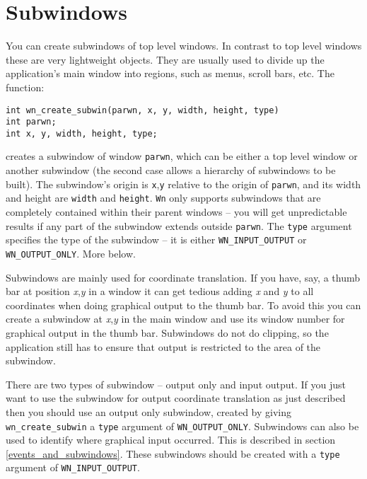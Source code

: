 \section{Subwindows}
You can create subwindows of top level windows.
In contrast to top level windows these are very lightweight objects.
They are usually used to divide up the application's main window into
regions, such as menus, scroll bars, etc.
\label{subwindows}
The function:
\begin{verbatim}
int wn_create_subwin(parwn, x, y, width, height, type)
int parwn;
int x, y, width, height, type;
\end{verbatim}
creates a subwindow of window {\tt parwn}, which can be either a
top level window or another subwindow (the second case allows
a hierarchy of subwindows to be built).
The subwindow's origin is {\tt x},{\tt y} relative to the origin
of {\tt parwn}, and its width and height are {\tt width} and {\tt height}.
{\tt Wn} only supports subwindows that are completely contained within
their parent windows -- you will get unpredictable results if any part
of the subwindow extends outside {\tt parwn}.
The {\tt type} argument specifies the type of the subwindow -- it is
either {\tt WN\_INPUT\_OUTPUT} or {\tt WN\_OUTPUT\_ONLY}.  More below.

Subwindows are mainly used for coordinate translation.  If you have, say,
a thumb bar at position {\em x},{\em y} in a window it can get 
tedious adding {\em x} and {\em y} to all coordinates when doing
graphical output to the thumb bar.
To avoid this you can create a subwindow at {\em x},{\em y} in the main
window and use its window number for graphical output in the thumb bar.
Subwindows do not do clipping, so the application still has to ensure that
output is restricted to the area of the subwindow.

There are two types of subwindow -- output only and input output.
If you just want to use the subwindow for output coordinate translation
as just described then you should use an output only subwindow,
created by giving {\tt wn\_create\_subwin} a {\tt type} argument of
{\tt WN\_OUTPUT\_ONLY}.
Subwindows can also be used to identify where graphical input occurred.
This is described in section \ref{events_and_subwindows}.
These subwindows should be created with a {\tt type} argument of
{\tt WN\_INPUT\_OUTPUT}.
